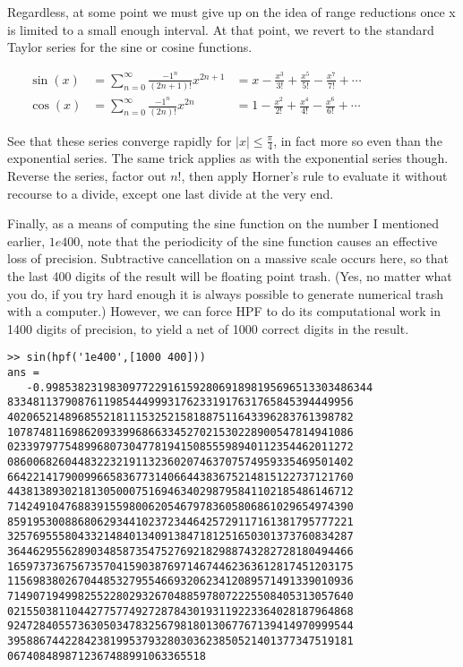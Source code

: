 \documentclass[a4paper,12pt]{article}
\begin{document}
Regardless, at some point we must give up on the idea of range reductions once x is limited to a small enough interval. At that point, we revert to the standard Taylor series for the sine or cosine functions.

\begin{align}
   \sin(x) & =  \sum_{n = 0}^{\infty}{\frac{-1^n}{(2n+1)!}}x^{2n+1} & = x - \frac{x^3}{3!} + \frac{x^5}{5!} - \frac{x^7}{7!} + \cdots\qquad\qquad\qquad\\
   \cos(x) & =  \sum_{n = 0}^{\infty}{\frac{-1^n}{(2n)!}}x^{2n} & = 1 - \frac{x^2}{2!} + \frac{x^4}{4!} - \frac{x^6}{6!} + \cdots\qquad\qquad\qquad
\end{align}

See that these series converge rapidly for $|x| \le \frac{\pi}{4}$, in fact more so even than the exponential series. The same trick applies as with the exponential series though. Reverse the series, factor out $n!$, then apply Horner's rule to evaluate it without recourse to a divide, except one last divide at the very end.

Finally, as a means of computing the sine function on the number I mentioned earlier, $1e400$, note that the periodicity of the sine function causes an effective loss of precision. Subtractive cancellation on a massive scale occurs here, so that the last 400 digits of the result will be floating point trash. (Yes, no matter what you do, if you try hard enough it is always possible to generate numerical trash with a computer.) However, we can force HPF to do its computational work in 1400 digits of precision, to yield a net of 1000 correct digits in the result.

\begin{lstlisting}
>> sin(hpf('1e400',[1000 400]))
ans =
   -0.998538231983097722916159280691898195696513303486344
833481137908761198544499931762331917631765845394449956
402065214896855218111532521581887511643396283761398782
107874811698620933996866334527021530228900547814941086
023397977548996807304778194150855598940112354462011272
086006826044832232191132360207463707574959335469501402
664221417900996658367731406644383675214815122737121760
443813893021813050007516946340298795841102185486146712
714249104768839155980062054679783605806861029654974390
859195300886806293441023723446425729117161381795777221
325769555804332148401340913847181251650301373760834287
364462955628903485873547527692182988743282728180494466
165973736756735704159038769714674462363612817451203175
115698380267044853279554669320623412089571491339010936
714907194998255228029326704885978072225508405313057640
021550381104427757749272878430193119223364028187964868
924728405573630503478325679818013067767139414970999544
395886744228423819953793280303623850521401377347519181
0674084898712367488991063365518
\end{lstlisting}
\end{document}
